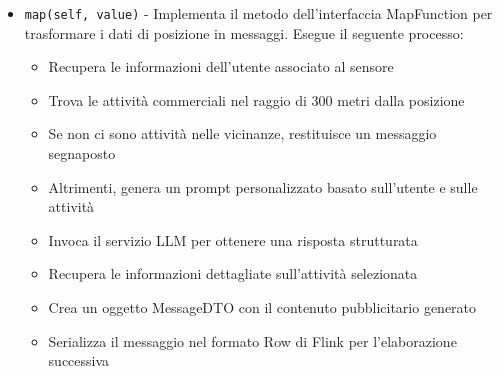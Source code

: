 \documentclass[10pt]{article}
\begin{document}
\begin{itemize}
\begin{itemize}
        \item \texttt{map(self, value)} - Implementa il metodo dell'interfaccia MapFunction per trasformare i dati di posizione in messaggi. Esegue il seguente processo:
        \begin{itemize}
            \item Recupera le informazioni dell'utente associato al sensore
            \item Trova le attività commerciali nel raggio di 300 metri dalla posizione
            \item Se non ci sono attività nelle vicinanze, restituisce un messaggio segnaposto
            \item Altrimenti, genera un prompt personalizzato basato sull'utente e sulle attività
            \item Invoca il servizio LLM per ottenere una risposta strutturata
            \item Recupera le informazioni dettagliate sull'attività selezionata
            \item Crea un oggetto MessageDTO con il contenuto pubblicitario generato
            \item Serializza il messaggio nel formato Row di Flink per l'elaborazione successiva
        \end{itemize}
    \end{itemize}
    \end{itemize}
\end{document}
